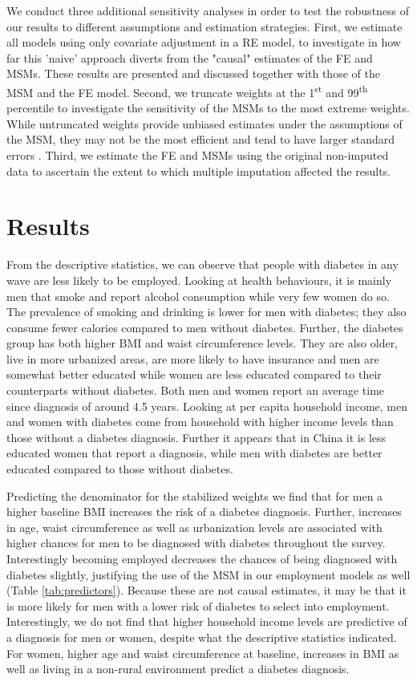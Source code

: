 We conduct three additional sensitivity analyses in order to test the robustness of our results to different assumptions and estimation strategies.
First, we estimate all models using only covariate adjustment in a \ac{RE} model, to investigate in how far this 'naive' approach diverts from the "causal" estimates of the \ac{FE} and \acp{MSM}. These results are presented and discussed together with those of the \ac{MSM} and the \ac{FE}  model. Second, we truncate weights at the 1\textsuperscript{st} and 99\textsuperscript{th} percentile to investigate the sensitivity of the \acp{MSM} to the most extreme weights. While untruncated weights provide unbiased estimates under the assumptions of the \ac{MSM}, they may not be the most efficient and tend to have larger standard errors \parencite{Cole2008}. Third, we estimate the \ac{FE} and \acp{MSM} using the original non-imputed data to ascertain the extent to which multiple imputation affected the results.

\section{\label{sec:Results5}Results}

From the descriptive statistics, we can observe that people with diabetes in any wave are less likely to be employed. Looking at health behaviours, it is mainly men that smoke and report alcohol consumption while very few women do so. The prevalence of smoking and drinking is lower for men with diabetes; they also consume fewer calories compared to men without diabetes. Further, the diabetes group has both higher \ac{BMI} and waist circumference levels. They are also older, live in more urbanized areas, are more likely to have insurance and men are somewhat better educated while women are less educated compared to their counterparts without diabetes. Both men and women report an average time since diagnosis of around 4.5 years. Looking at per capita household income, men and women with diabetes come from household with higher income levels than those without a diabetes diagnosis. Further it appears that in China it is less educated women that report a diagnosis, while men with diabetes are better educated compared to those without diabetes.

Predicting the denominator for the stabilized weights we find that for men a higher baseline \ac{BMI} increases the risk of a diabetes diagnosis. Further, increases in age, waist circumference as well as urbanization levels are associated with higher chances for men to be diagnosed with diabetes throughout the survey. Interestingly becoming employed decreases the chances of being diagnosed with diabetes slightly, justifying the use of the \ac{MSM} in our employment models as well  (Table \ref{tab:predictors}). Because these are not causal estimates, it may be that it is more likely for men with a lower risk of diabetes to select into employment. Interestingly, we do not find that higher household income levels are predictive of a diagnosis for men or women, despite what the descriptive statistics indicated. For women, higher age and waist circumference at baseline, increases in \ac{BMI} as well as living in a non-rural environment predict a diabetes diagnosis. 

